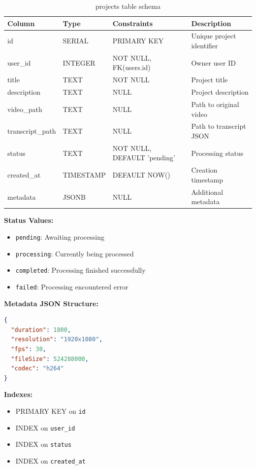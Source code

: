 \begin{table}[h]
\centering
\begin{tabular}{|l|l|l|p{4cm}|}
\hline
\textbf{Column} & \textbf{Type} & \textbf{Constraints} & \textbf{Description} \\
\hline
id & SERIAL & PRIMARY KEY & Unique project identifier \\
user\_id & INTEGER & NOT NULL, FK(users.id) & Owner user ID \\
title & TEXT & NOT NULL & Project title \\
description & TEXT & NULL & Project description \\
video\_path & TEXT & NULL & Path to original video \\
transcript\_path & TEXT & NULL & Path to transcript JSON \\
status & TEXT & NOT NULL, DEFAULT 'pending' & Processing status \\
created\_at & TIMESTAMP & DEFAULT NOW() & Creation timestamp \\
metadata & JSONB & NULL & Additional metadata \\
\hline
\end{tabular}
\caption{projects table schema}
\end{table}

\textbf{Status Values:}
\begin{itemize}
    \item \texttt{pending}: Awaiting processing
    \item \texttt{processing}: Currently being processed
    \item \texttt{completed}: Processing finished successfully
    \item \texttt{failed}: Processing encountered error
\end{itemize}

\textbf{Metadata JSON Structure:}
\begin{lstlisting}[language=JSON]
{
  "duration": 1800,
  "resolution": "1920x1080",
  "fps": 30,
  "fileSize": 524288000,
  "codec": "h264"
}
\end{lstlisting}

\textbf{Indexes:}
\begin{itemize}
    \item PRIMARY KEY on \texttt{id}
    \item INDEX on \texttt{user\_id}
    \item INDEX on \texttt{status}
    \item INDEX on \texttt{created\_at}
\end{itemize}

